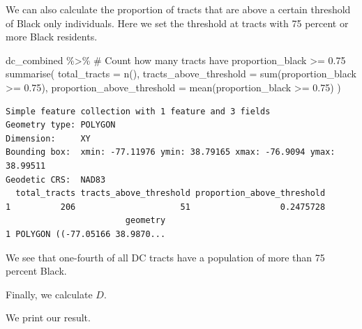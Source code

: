 \documentclass[
  letterpaper,
  DIV=11,
  numbers=noendperiod]{scrartcl}
\newenvironment{Shaded}{\begin{snugshade}}{\end{snugshade}}
\newcommand{\AttributeTok}[1]{\textcolor[rgb]{0.40,0.45,0.13}{#1}}
\newcommand{\CommentTok}[1]{\textcolor[rgb]{0.37,0.37,0.37}{#1}}
\newcommand{\ConstantTok}[1]{\textcolor[rgb]{0.56,0.35,0.01}{#1}}
\newcommand{\FloatTok}[1]{\textcolor[rgb]{0.68,0.00,0.00}{#1}}
\newcommand{\FunctionTok}[1]{\textcolor[rgb]{0.28,0.35,0.67}{#1}}
\newcommand{\NormalTok}[1]{\textcolor[rgb]{0.00,0.23,0.31}{#1}}
\newcommand{\OtherTok}[1]{\textcolor[rgb]{0.00,0.23,0.31}{#1}}
\newcommand{\SpecialCharTok}[1]{\textcolor[rgb]{0.37,0.37,0.37}{#1}}
\begin{document}
We can also calculate the proportion of tracts that are above a certain
threshold of Black only individuals. Here we set the threshold at tracts
with 75 percent or more Black residents.

\begin{Shaded}
\begin{Highlighting}[]
\NormalTok{dc\_combined }\SpecialCharTok{\%\textgreater{}\%}
  \CommentTok{\# Count how many tracts have proportion\_black \textgreater{}= 0.75}
  \FunctionTok{summarise}\NormalTok{(}
    \AttributeTok{total\_tracts =} \FunctionTok{n}\NormalTok{(),}
    \AttributeTok{tracts\_above\_threshold =} \FunctionTok{sum}\NormalTok{(proportion\_black }\SpecialCharTok{\textgreater{}=} \FloatTok{0.75}\NormalTok{),}
    \AttributeTok{proportion\_above\_threshold =} \FunctionTok{mean}\NormalTok{(proportion\_black }\SpecialCharTok{\textgreater{}=} \FloatTok{0.75}\NormalTok{)}
\NormalTok{  )}
\end{Highlighting}
\end{Shaded}

\begin{verbatim}
Simple feature collection with 1 feature and 3 fields
Geometry type: POLYGON
Dimension:     XY
Bounding box:  xmin: -77.11976 ymin: 38.79165 xmax: -76.9094 ymax: 38.99511
Geodetic CRS:  NAD83
  total_tracts tracts_above_threshold proportion_above_threshold
1          206                     51                  0.2475728
                        geometry
1 POLYGON ((-77.05166 38.9870...
\end{verbatim}

We see that one-fourth of all DC tracts have a population of more than
75 percent Black.

Finally, we calculate \(D\).

\begin{Shaded}
\end{Shaded}

We print our result.
\end{document}
